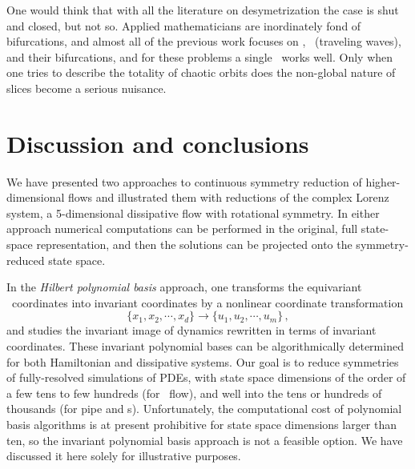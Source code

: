 \documentclass[final,number,sort&compress]{elsarticle}
\begin{document}
One would think that with all the literature on
desymetrization the case is shut and closed, but not so.
Applied mathematicians are inordinately fond of bifurcations,
and almost all of the previous work focuses on \eqva, \reqva\
(traveling waves), and their bifurcations, and for these
problems a single \slice\ works well. Only when one tries to
describe the totality of chaotic orbits does the non-global
nature of slices become a serious nuisance.

\section{\label{sec:concl} Discussion and conclusions}

We have presented two approaches to continuous symmetry
reduction of higher-dimensional flows and illustrated them
with reductions of the complex Lorenz system, a 5-dimensional
dissipative flow with rotational symmetry.
In either approach numerical computations can be performed in
the original, full state-space representation, and then the
solutions can be projected onto the symmetry-reduced state
space.

In the {\em Hilbert polynomial basis} approach, one transforms
the equi\-vari\-ant \statesp\ coordinates into in\-vari\-ant coordinates by
a nonlinear coordinate transformation
\[
\{x_1,x_2,\cdots,x_d\} \to \{u_1,u_2,\cdots,u_m\}
\,,
\]
and studies the in\-vari\-ant image of dynamics rewritten in
terms of in\-vari\-ant coordinates. These in\-vari\-ant polynomial
bases can be algorithmically determined for both Hamiltonian
and dissipative systems. Our goal is to reduce symmetries of
fully-resolved simulations of PDEs, with state space
dimensions of the order of a few tens to few hundreds (for
\KS\ flow), and well into the tens or hundreds of thousands (for pipe
and \pCf s). Unfortunately, the computational cost of
polynomial basis algorithms is at present prohibitive for
state space dimensions larger than ten, so the in\-vari\-ant
polynomial basis approach is not a feasible option. We have
discussed it here solely for illustrative purposes.
\end{document}
